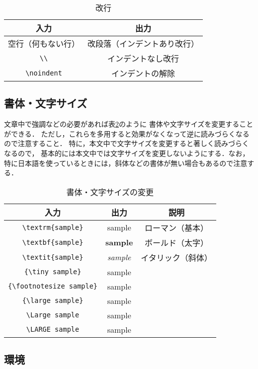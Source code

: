    \begin{table}[h]
       \caption{改行}
       \label{return}
       \centering
       \begin{tabular}{c|c}
           入力 & 出力　\\ \hline
           空行（何もない行）& 改段落（インデントあり改行）\\
           \verb|\\| & インデントなし改行 \\
           \verb|\noindent| & インデントの解除
       \end{tabular}
   \end{table}

\subsection{書体・文字サイズ}

文章中で強調などの必要があれば表\ref{style_size}のように
書体や文字サイズを変更することができる．
ただし，これらを多用すると効果がなくなって逆に読みづらくなるので注意すること．
特に，本文中で文字サイズを変更すると著しく読みづらくなるので，
基本的には本文中では文字サイズを変更しないようにする．なお，
特に日本語を使っているときには，斜体などの書体が無い場合もあるので注意する．

   \begin{table}[h]
       \caption{書体・文字サイズの変更}
       \label{style_size}
       \centering
       \begin{tabular}{c|c|c}
           入力 & 出力 & 説明　\\ \hline
           \verb|\textrm{sample}| & \textrm{sample} & ローマン（基本）\\
           \verb|\textbf{sample}| & \textbf{sample} & ボールド（太字）\\
           \verb|\textit{sample}| & \textit{sample} & イタリック（斜体） \\
           \verb|{\tiny sample}| & {\tiny sample} & \\
           \verb|{\footnotesize sample}| & {\footnotesize sample} & \\
           \verb|{\large sample}| & {\large sample} & \\
           \verb|\Large sample| & {\Large sample} & \\
           \verb|\LARGE sample| & {\LARGE sample} &
       \end{tabular}
   \end{table}


\subsection{環境}

